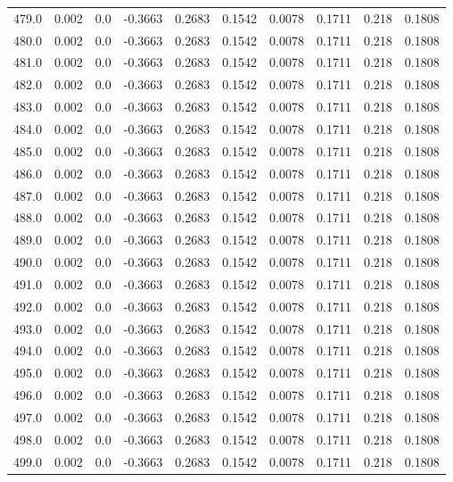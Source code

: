 \begin{longtable}{lrrrrrrrrr}
479.0 & 0.002 & 0.0 & -0.3663 & 0.2683 & 0.1542 & 0.0078 & 0.1711 & 0.218 & 0.1808 \\
480.0 & 0.002 & 0.0 & -0.3663 & 0.2683 & 0.1542 & 0.0078 & 0.1711 & 0.218 & 0.1808 \\
481.0 & 0.002 & 0.0 & -0.3663 & 0.2683 & 0.1542 & 0.0078 & 0.1711 & 0.218 & 0.1808 \\
482.0 & 0.002 & 0.0 & -0.3663 & 0.2683 & 0.1542 & 0.0078 & 0.1711 & 0.218 & 0.1808 \\
483.0 & 0.002 & 0.0 & -0.3663 & 0.2683 & 0.1542 & 0.0078 & 0.1711 & 0.218 & 0.1808 \\
484.0 & 0.002 & 0.0 & -0.3663 & 0.2683 & 0.1542 & 0.0078 & 0.1711 & 0.218 & 0.1808 \\
485.0 & 0.002 & 0.0 & -0.3663 & 0.2683 & 0.1542 & 0.0078 & 0.1711 & 0.218 & 0.1808 \\
486.0 & 0.002 & 0.0 & -0.3663 & 0.2683 & 0.1542 & 0.0078 & 0.1711 & 0.218 & 0.1808 \\
487.0 & 0.002 & 0.0 & -0.3663 & 0.2683 & 0.1542 & 0.0078 & 0.1711 & 0.218 & 0.1808 \\
488.0 & 0.002 & 0.0 & -0.3663 & 0.2683 & 0.1542 & 0.0078 & 0.1711 & 0.218 & 0.1808 \\
489.0 & 0.002 & 0.0 & -0.3663 & 0.2683 & 0.1542 & 0.0078 & 0.1711 & 0.218 & 0.1808 \\
490.0 & 0.002 & 0.0 & -0.3663 & 0.2683 & 0.1542 & 0.0078 & 0.1711 & 0.218 & 0.1808 \\
491.0 & 0.002 & 0.0 & -0.3663 & 0.2683 & 0.1542 & 0.0078 & 0.1711 & 0.218 & 0.1808 \\
492.0 & 0.002 & 0.0 & -0.3663 & 0.2683 & 0.1542 & 0.0078 & 0.1711 & 0.218 & 0.1808 \\
493.0 & 0.002 & 0.0 & -0.3663 & 0.2683 & 0.1542 & 0.0078 & 0.1711 & 0.218 & 0.1808 \\
494.0 & 0.002 & 0.0 & -0.3663 & 0.2683 & 0.1542 & 0.0078 & 0.1711 & 0.218 & 0.1808 \\
495.0 & 0.002 & 0.0 & -0.3663 & 0.2683 & 0.1542 & 0.0078 & 0.1711 & 0.218 & 0.1808 \\
496.0 & 0.002 & 0.0 & -0.3663 & 0.2683 & 0.1542 & 0.0078 & 0.1711 & 0.218 & 0.1808 \\
497.0 & 0.002 & 0.0 & -0.3663 & 0.2683 & 0.1542 & 0.0078 & 0.1711 & 0.218 & 0.1808 \\
498.0 & 0.002 & 0.0 & -0.3663 & 0.2683 & 0.1542 & 0.0078 & 0.1711 & 0.218 & 0.1808 \\
499.0 & 0.002 & 0.0 & -0.3663 & 0.2683 & 0.1542 & 0.0078 & 0.1711 & 0.218 & 0.1808 \\

\end{longtable}
